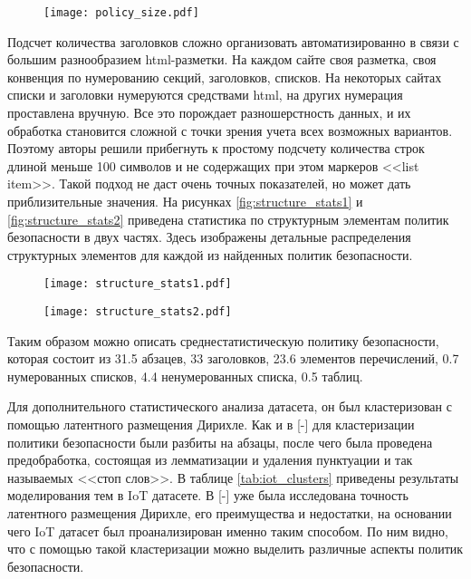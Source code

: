 \documentclass[../main]{subfiles}
\begin{document}
\begin{figure}[H]
    \centering
    {\texttt{[image: policy\_size.pdf]}}
    \vspace{-\baselineskip}
\end{figure}

Подсчет количества заголовков сложно организовать автоматизированно в связи с большим разнообразием html-разметки. На каждом сайте своя разметка, своя конвенция по нумерованию секций, заголовков, списков. На некоторых сайтах списки и заголовки нумеруются средствами html, на других нумерация проставлена вручную. Все это порождает разношерстность данных, и их обработка становится сложной с точки зрения учета всех возможных вариантов. Поэтому авторы решили прибегнуть к простому подсчету количества строк длиной меньше 100 символов и не содержащих при этом маркеров <<{list item}>>. Такой подход не даст очень точных показателей, но может дать приблизительные значения. На рисунках \ref{fig:structure_stats1} и \ref{fig:structure_stats2} приведена статистика по структурным элементам политик безопасности в двух частях. Здесь изображены детальные распределения структурных элементов для каждой из найденных политик безопасности.

\begin{figure}[H]
    \centering
    {\texttt{[image: structure\_stats1.pdf]}}
    \vspace{-\baselineskip}
\end{figure}

\begin{figure}[H]
    \centering
    {\texttt{[image: structure\_stats2.pdf]}}
    \vspace{-\baselineskip}
\end{figure}

Таким образом можно описать среднестатистическую политику безопасности, которая состоит из 31.5 абзацев, 33 заголовков, 23.6 элементов перечислений, 0.7 нумерованных списков, 4.4 ненумерованных списка, 0.5 таблиц.

Для дополнительного статистического анализа датасета, он был кластеризован с помощью латентного размещения Дирихле. Как и в [-] для кластеризации политики безопасности были разбиты на абзацы, после чего была проведена предобработка, состоящая из лемматизации и удаления пунктуации и так называемых <<стоп слов>>. В таблице \ref{tab:iot_clusters} приведены результаты моделирования тем в IoT датасете. В [-] уже была исследована точность латентного размещения Дирихле, его преимущества и недостатки, на основании чего IoT датасет был проанализирован именно таким способом.  По ним видно, что с помощью такой кластеризации можно выделить различные аспекты политик безопасности.
\end{document}
